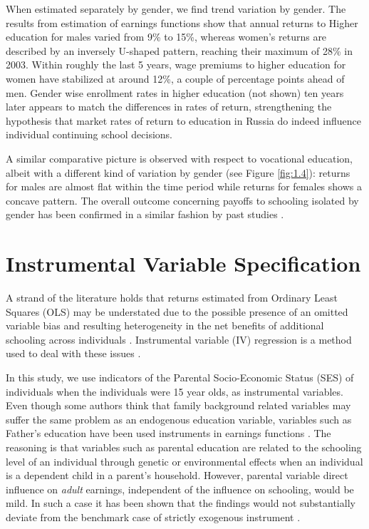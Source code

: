 \documentclass[alpha-refs]{wiley-article-01g}
\begin{document}
When estimated separately by gender, we find trend variation by gender. The results from estimation of earnings functions show that annual returns to Higher education for males varied from 9\% to 15\%, whereas women's returns are described by an inversely U-shaped pattern, reaching their maximum of 28\% in 2003. Within roughly the last 5 years, wage premiums to higher education for women have stabilized at around 12\%, a couple of percentage points ahead of men.  Gender wise enrollment rates in higher education (not shown) ten years later appears to match the differences in rates of return, strengthening the hypothesis that market rates of return to education in Russia do indeed influence individual continuing school decisions. 

A similar comparative picture is observed with respect to vocational education, albeit with a different kind of variation by gender (see Figure \ref{fig:1.4}): returns for males are almost flat within the time period while returns for females shows a concave pattern. The overall outcome concerning payoffs to schooling isolated by gender has been confirmed in a similar fashion by past studies \parencite[e.g.,][]{Cheidvasser2007}.

\section{Instrumental Variable Specification}

A strand of the literature holds that returns estimated from Ordinary Least 
Squares (OLS)  may be understated due to the possible presence of an 
omitted variable bias and resulting heterogeneity in the net benefits of 
additional schooling across individuals 
\parencite[e.g.,][]{Sakellariou2004, Akhmedjonov2011}. Instrumental 
variable (IV) regression is a method used to deal with these issues 
\parencite[e.g.,][]{Angrist1991, Card2001}.

In this study, we use indicators of the Parental Socio-Economic Status 
(SES) of individuals when the individuals were 15 year olds, as 
instrumental variables. Even though some authors think that family 
background related variables may suffer the same problem as an endogenous 
education variable, variables such as Father's education have been used 
instruments in earnings functions \parencite[e.g.,][]{Trostel2002, 
Sakellariou2004, Parker2006, Hoogerheide2012}. The reasoning is that 
variables such as parental education are related to the schooling level of 
an individual through genetic or environmental effects when an individual 
is a dependent child in a parent's household. However, parental variable 
direct influence on \textit{adult} earnings, independent of the influence 
on schooling, would be mild. In such a case it has been shown that the 
findings would not substantially deviate from the benchmark case of 
strictly exogenous instrument \parencite{Hoogerheide2012}.
\end{document}
